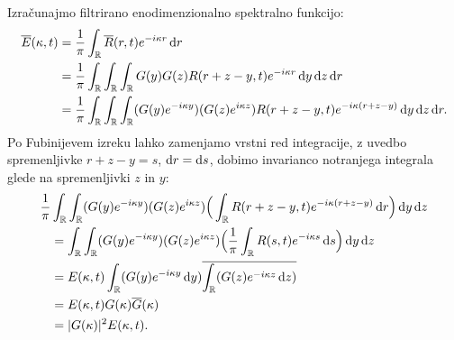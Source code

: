 \documentclass[mat2, tisk]{fmfdelo}
\newcommand{\R}{\mathbb R}
\newcommand{\bd}{\textbf}
\begin{document}
\begin{dokaz}
Izračunajmo filtrirano enodimenzionalno spektralno funkcijo:
\begin{align*}
\overline{E}(\kappa, t) &= \frac{1}{\pi} \int_\R \overline{R}(r, t) e^{-i\kappa r} \dif r \\
&= \frac{1}{\pi}\int_{\R} \int_{\R} \int_\R G(y) G(z) R(r+z-y,t) e^{-i\kappa r} \dif y \dif z \dif r \\
&= \frac{1}{\pi}\int_{\R} \int_{\R} \int_\R (G(y) e^{-i\kappa y}) (G(z) e^{i\kappa z}) R(r+z-y,t) e^{-i\kappa(r+z-y)} \dif y \dif z \dif r.
\end{align*}
Po Fubinijevem izreku lahko zamenjamo vrstni red integracije,  
z uvedbo spremenljivke $r + z - y = s$, $\dif r = \dif s$, dobimo invarianco notranjega integrala glede na
spremenljivki $z$ in $y$:
\begin{align*}
\frac{1}{\pi}&\int_{\R} \int_\R (G(y) e^{-i\kappa y}) (G(z) e^{i\kappa z}) \Big(\int_{\R} R(r+z-y,t) e^{-i\kappa(r+z-y)} \dif r \Big) \dif y \dif z \\
&= \int_{\R} \int_\R (G(y) e^{-i\kappa y}) (G(z) e^{i\kappa z}) \Big(\frac{1}{\pi}\int_{\R} R(s,t) e^{-i\kappa s} \dif s \Big) \dif y \dif z \\
&= E(\kappa, t) \int_\R (G(y) e^{-i\kappa y}\dif y) \overline{\int_{\R} (G(z) e^{-i\kappa z} \dif z)} \\
&= E(\kappa, t) G(\kappa) \overline{G}(\kappa) \\
&= |G(\kappa)|^2 E(\kappa, t).
\end{align*}


\end{dokaz}
\end{document}
